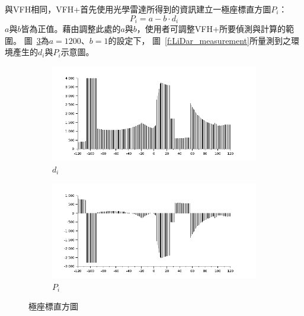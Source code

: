 與VFH相同，VFH+首先使用光學雷達所得到的資訊建立一極座標直方圖$P_i$：
\begin{equation}
	P_i = a - b\cdot d_i
\end{equation}
$a$與$b$皆為正值。藉由調整此處的$a$與$b$，使用者可調整VFH+所要偵測與計算的範圍。
圖~\ref{f:polar_histogram}為$a=1200$、$b=1$的設定下，
圖~\ref{f:LiDar_measurement}所量測到之環境產生的$d_i$與$P_i$示意圖。
\begin{figure}[h!]
	\centering
	\begin{subfigure}[b]{0.7\textwidth}
		\includegraphics[width=\textwidth]{figures/algorithm/polar_histogram}
		\caption{$d_i$}
		\label{f:polar_histogram_original}
	\end{subfigure}
	\begin{subfigure}[b]{0.7\textwidth}
		\includegraphics[width=\textwidth]{figures/algorithm/polar_histogram_modified}
		\caption{$P_i$}
		\label{f:polar_histogram_modified}
	\end{subfigure}
	\caption{極座標直方圖}
	\label{f:polar_histogram}
\end{figure}

